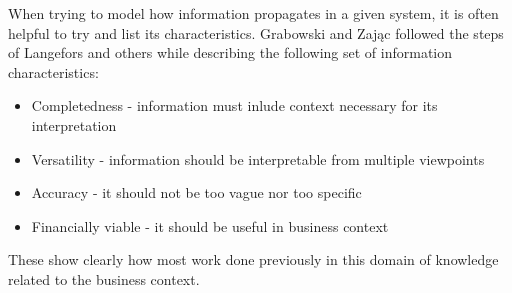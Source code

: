 When trying to model how information propagates in a given system, it is often helpful to try and list its characteristics.
Grabowski and Zając followed the steps of Langefors and others while describing the following set of information characteristics:
\begin{itemize}
    \item Completedness - information must inlude context necessary for its interpretation
    \item Versatility - information should be interpretable from multiple viewpoints
    \item Accuracy - it should not be too vague nor too specific
    \item Financially viable - it should be useful in business context
\end{itemize}
These show clearly how most work done previously in this domain of knowledge related to the business context.
